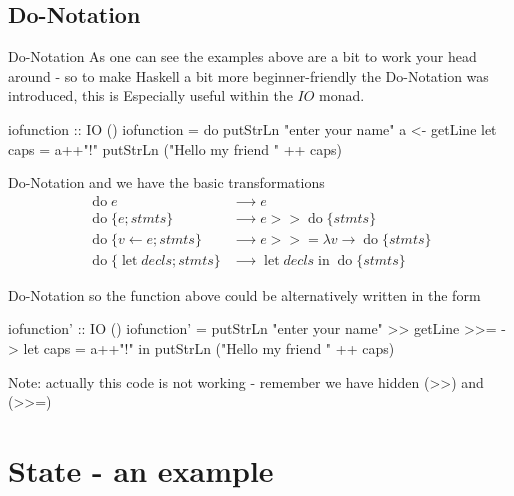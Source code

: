 \documentclass{beamer}
\DeclareMathOperator{\iin}{in}
\DeclareMathOperator{\ddo}{do}
\DeclareMathOperator{\llet}{let}
\begin{document}
\subsection{Do-Notation}
\begin{frame}[fragile]{Do-Notation}
As one can see the examples above are a bit to work your head around - so to
make Haskell a bit more beginner-friendly the Do-Notation was introduced, this
is Especially useful within the $IO$ monad.
\begin{code}
    iofunction :: IO ()
    iofunction = do putStrLn "enter your name"
                    a <- getLine
                    let caps = a++"!"
                    putStrLn ("Hello my friend " ++ caps)
\end{code}
\end{frame}
\begin{frame}[fragile]{Do-Notation}
and we have the basic transformations
\begin{align*}
    \ddo e                      & ⟶ e\\
    \ddo \{e; stmts\}           & ⟶ e >> \ddo \{stmts\}\\
    \ddo \{v ← e; stmts\}       & ⟶ e >>=λv → \ddo \{stmts\}\\
    \ddo \{\llet decls; stmts\} & ⟶ \llet decls \iin \ddo \{stmts\}
\end{align*}
\end{frame}
\begin{frame}[fragile]{Do-Notation}
so the function above could be alternatively written in the form
\begin{code}%
    iofunction' :: IO ()
    iofunction' = putStrLn "enter your name" >>
                  getLine >>= \a ->
                  let caps = a++"!" in
                  putStrLn ("Hello my friend " ++ caps)
\end{code}
Note: actually this code is not working - remember we have hidden (>>) and (>>=)
\end{frame}
\section{State - an example} %
\label{sec:state:an:example}
\end{document}
